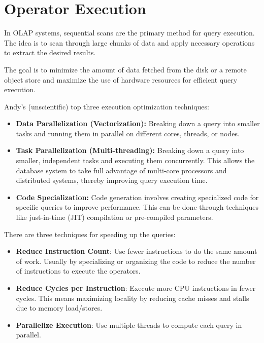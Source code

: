 \documentclass[11pt]{article}
\begin{document}
\maketitle
\thispagestyle{plain}
\section{Operator Execution}
In OLAP systems, sequential scans are the primary method for query execution. The idea is to scan through large chunks of data and apply necessary operations to extract the desired results. 

The goal is to minimize the amount of data fetched from the disk or a remote object store and maximize the use of hardware resources for efficient query execution. 

Andy's (unscientific) top three execution optimization techniques:
\begin{itemize}
    \item \textbf{Data Parallelization (Vectorization):} Breaking down a query into smaller tasks and running them in parallel on different cores, threads, or nodes. 
    \item \textbf{Task Parallelization (Multi-threading):} Breaking down a query into smaller, independent tasks and executing them concurrently. This allows the database system to take full advantage of multi-core processors and distributed systems, thereby improving query execution time.
    \item \textbf{Code Specialization:} Code generation involves creating specialized code for specific queries to improve performance. This can be done through techniques like just-in-time (JIT) compilation or pre-compiled parameters.
\end{itemize}

There are three techniques for speeding up the queries:
\begin{itemize}
    \item \textbf{Reduce Instruction Count}: 
    Use fewer instructions to do the same amount of work. Usually by specializing or organizing the code to reduce the number of instructions to execute the operators. 
    \item \textbf{Reduce Cycles per Instruction}: 
    Execute more CPU instructions in fewer cycles. This means maximizing locality by reducing cache misses and stalls due to memory load/stores.
    \item \textbf{Parallelize Execution}: 
    Use multiple threads to compute each query in parallel.
\end{itemize}
\end{document}
